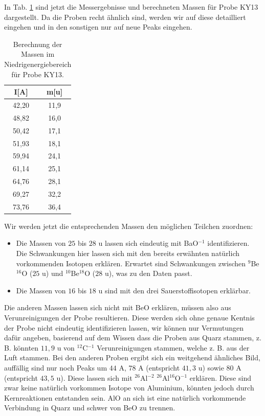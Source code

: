 In Tab. \ref{KY} sind jetzt die Messergebnisse und berechneten Massen für Probe KY13 dargestellt.
Da die Proben recht ähnlich sind, werden wir auf diese detailliert eingehen und in den sonstigen nur auf neue Peaks eingehen.
\begin{table}[h]
\centering
\caption{Berechnung der Massen im Niedrigenergiebereich für Probe KY13.}
\begin{tabular}{|c |c|}
\hline
I[A] & m[u] \\
\hline
42,20 & 11,9 \\
48,82 & 16,0 \\
50,42 & 17,1 \\
51,93 & 18,1 \\
59,94 & 24,1 \\
61,14 & 25,1 \\
64,76 & 28,1 \\
69,27 & 32,2 \\
73,76 & 36,4 \\
\hline
\end{tabular}
\label{KY}
\end{table}
Wir werden jetzt die entsprechenden Massen den möglichen Teilchen zuordnen:
\begin{itemize}
\item Die Massen von $25$ bis $28$ u lassen sich eindeutig mit BaO$^{-1}$ identifizieren.
Die Schwankungen hier lassen sich mit den bereits erwähnten natürlich vorkommenden Isotopen erklären.
Erwartet sind Schwankungen zwischen $^9$Be$^{16}$O ($25$ u) und $^{10}$Be$^{18}$O ($28$ u), was zu den Daten passt.
\item Die Massen von $16$ bis $18$ u sind mit den drei Sauerstoffisotopen erklärbar.
\end{itemize}

Die anderen Massen lassen sich nicht mit BeO erklären, müssen also aus Verunreinigungen der Probe resultieren.
Diese werden sich ohne genaue Kentnis der Probe nicht eindeutig identifizieren lassen, wir können nur Vermutungen dafür angeben, basierend auf dem Wissen dass die Proben aus Quarz stammen, z. B. könnten $11,9$ u von  $^{12}$C$^{-1}$ Verunreinigungen stammen, welche z. B. aus der Luft stammen.
Bei den anderen Proben ergibt sich ein weitgehend ähnliches Bild, auffällig sind nur noch Peaks um $44$ A,  $78$ A (entspricht $41,3$ u) sowie $80$ A (entspricht $43,5$ u).
Diese lassen sich mit $^{26}$Al$^{-2}$ $^{26}$Al$^{16}$O$^{-1}$ erklären.
Diese sind zwar keine natürlich vorkommen Isotope von Aluminium, könnten jedoch durch Kernreaktionen entstanden sein.
AlO an sich ist eine natürlich vorkommende Verbindung in Quarz und schwer von BeO zu trennen.

